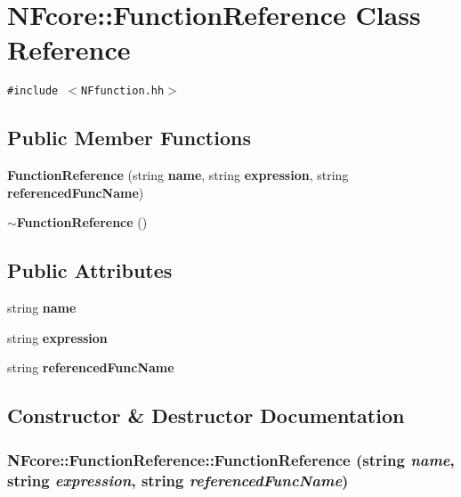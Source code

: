 \section{NFcore::FunctionReference Class Reference}
\label{classNFcore_1_1FunctionReference}
{\tt \#include $<$NFfunction.hh$>$}

\subsection*{Public Member Functions}
\begin{CompactItemize}
\item 
{\bf FunctionReference} (string {\bf name}, string {\bf expression}, string {\bf referencedFuncName})
\item 
{\bf $\sim$FunctionReference} ()
\end{CompactItemize}
\subsection*{Public Attributes}
\begin{CompactItemize}
\item 
string {\bf name}
\item 
string {\bf expression}
\item 
string {\bf referencedFuncName}
\end{CompactItemize}


\subsection{Constructor \& Destructor Documentation}
\subsubsection{\setlength{\rightskip}{0pt plus 5cm}NFcore::FunctionReference::FunctionReference (string {\em name}, string {\em expression}, string {\em referencedFuncName})\hspace{0.3cm}{\tt  [inline]}}\label{classNFcore_1_1FunctionReference_1976088242322ad23e9b56ca7bcc450c}


